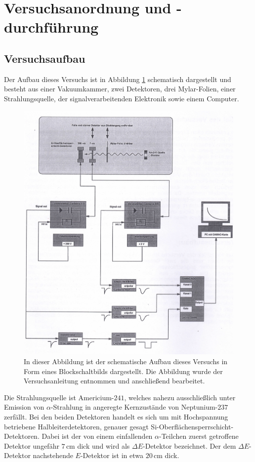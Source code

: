 \section{Versuchsanordnung und -durchführung}

\subsection{Versuchsaufbau}

Der Aufbau dieses Versuchs ist in Abbildung \ref{Aufbau} schematisch dargestellt und besteht aus einer Vakuumkammer, zwei Detektoren, drei Mylar-Folien, einer Strahlungsquelle, der signalverarbeitenden Elektronik sowie einem Computer.
\begin{figure}[H]
	\centering
	\includegraphics[width=1.0\textwidth]{img/Aufbau}
	\caption{In dieser Abbildung ist der schematische Aufbau dieses Versuchs in Form eines Blockschaltbilds dargestellt. Die Abbildung wurde der Versuchsanleitung\cite{wwu} entnommen und anschließend bearbeitet.}
	\label{Aufbau}
\end{figure}
\noindent Die Strahlungsquelle ist Americium-$241$, welches nahezu ausschließlich unter Emission von $\alpha$-Strahlung in angeregte Kernzustände von Neptunium-$237$ zerfällt.
Bei den beiden Detektoren handelt es sich um mit Hochspannung betriebene Halbleiterdetektoren, genauer gesagt Si-Oberflächensperrschicht-Detektoren.
Dabei ist der von einem einfallenden $\alpha$-Teilchen zuerst getroffene Detektor ungefähr $7\,$cm dick und wird als $\Delta E$-Detektor bezeichnet.
Der dem $\Delta E$-Detektor nachstehende $E$-Detektor ist in etwa $20\,$cm dick.

